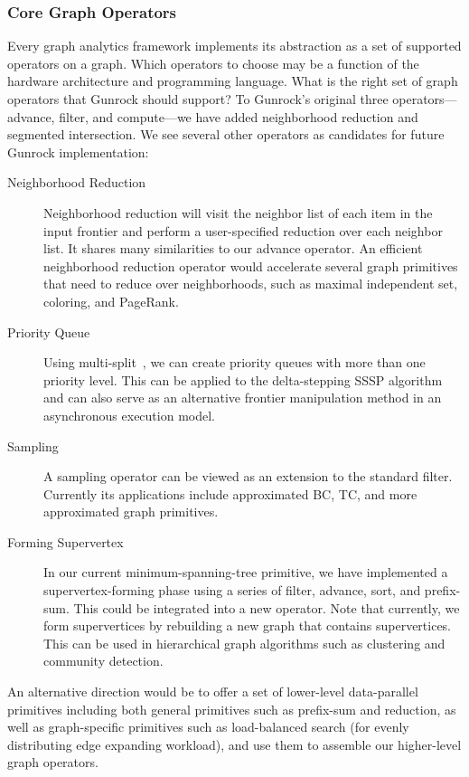 \documentclass[format=acmsmall,review=false,screen=true]{acmart}
\begin{document}
\subsubsection{Core Graph Operators}
Every graph analytics framework implements its abstraction as a set of
supported operators on a graph. Which operators to choose may be a
function of the hardware architecture and programming language. What
is the right set of graph operators that Gunrock should support? To
Gunrock's original three operators---advance, filter, and compute---we
have added neighborhood reduction and segmented intersection. We see
several other operators as candidates for future Gunrock
implementation:
\begin{description}
\item[Neighborhood Reduction] Neighborhood reduction will visit the
  neighbor list of each item in the input frontier and perform a
  user-specified reduction over each neighbor list. It shares many
  similarities to our advance operator. An efficient neighborhood
  reduction operator would accelerate several graph primitives that
  need to reduce over neighborhoods, such as maximal independent set,
  coloring, and PageRank.
\item[Priority Queue] Using multi-split~\cite{Ashkiani:2016:GM}, we
  can create priority queues with more than one priority level. This
  can be applied to the delta-stepping SSSP algorithm and can also
  serve as an alternative frontier manipulation method in an
  asynchronous execution model.
\item[Sampling] A sampling operator can be viewed as an extension to
  the standard filter. Currently its applications include approximated
  BC, TC, and more approximated graph primitives.
\item[Forming Supervertex] In our current minimum-spanning-tree
  primitive, we have implemented a supervertex-forming phase using a
  series of filter, advance, sort, and prefix-sum. This could be
  integrated into a new operator. Note that currently, we form
  supervertices by rebuilding a new graph that contains supervertices.
  This can be used in hierarchical graph algorithms such as clustering
  and community detection.
\end{description}

An alternative direction would be to offer a set of lower-level
data-parallel primitives including both general primitives such as
prefix-sum and reduction, as well as graph-specific primitives such as
load-balanced search (for evenly distributing edge expanding
workload), and use them to assemble our higher-level graph operators.
\end{document}
